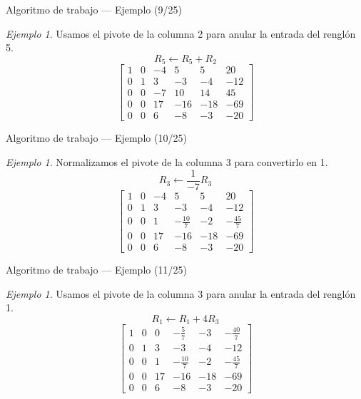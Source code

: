 \documentclass[aspectratio=169,11pt]{beamer}
\theoremstyle{remark}
\newtheorem{Ejem}[definicion]{Ejemplo}
\begin{document}
\begin{frame}{Algoritmo de trabajo — Ejemplo (9/25)}
\begin{Ejem}
Usamos el pivote de la columna 2 para anular la entrada del renglón 5.
\[
R_{5}\leftarrow R_{5}+R_{2}
\]
\[
\left[\begin{array}{ccccc|c}
1 & 0 & -4 & 5 & 5 & 20\\
0 & 1 & 3 & -3 & -4 & -12\\
0 & 0 & -7 & 10 & 14 & 45\\
0 & 0 & 17 & -16 & -18 & -69\\
0 & 0 & 6 & -8 & -3 & -20
\end{array}\right]
\]
\end{Ejem}
\end{frame}

\begin{frame}{Algoritmo de trabajo — Ejemplo (10/25)}
\begin{Ejem}
Normalizamos el pivote de la columna 3 para convertirlo en 1.
\[
R_{3}\leftarrow \frac{1}{-7}R_{3}
\]
\[
\left[\begin{array}{ccccc|c}
1 & 0 & -4 & 5 & 5 & 20\\
0 & 1 & 3 & -3 & -4 & -12\\
0 & 0 & 1 & - \frac{10}{7} & -2 & - \frac{45}{7}\\
0 & 0 & 17 & -16 & -18 & -69\\
0 & 0 & 6 & -8 & -3 & -20
\end{array}\right]
\]
\end{Ejem}
\end{frame}

\begin{frame}{Algoritmo de trabajo — Ejemplo (11/25)}
\begin{Ejem}
Usamos el pivote de la columna 3 para anular la entrada del renglón 1.
\[
R_{1}\leftarrow R_{1}+4R_{3}
\]
\[
\left[\begin{array}{ccccc|c}
1 & 0 & 0 & - \frac{5}{7} & -3 & - \frac{40}{7}\\
0 & 1 & 3 & -3 & -4 & -12\\
0 & 0 & 1 & - \frac{10}{7} & -2 & - \frac{45}{7}\\
0 & 0 & 17 & -16 & -18 & -69\\
0 & 0 & 6 & -8 & -3 & -20
\end{array}\right]
\]
\end{Ejem}
\end{frame}
\end{document}
